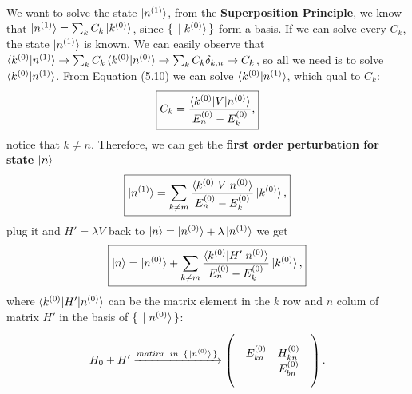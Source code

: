\documentclass[UTF8,12pt]{article} %
\begin{document}
We want to solve the state $\ket{n^{(1)}}$, from the {\bf Superposition Principle}, we know that $\ket{n^{(1)}}=\sum_k{C_k \ket{k^{(0)}}}$, since $\set{\ket{k^{(0)}}}$ form a basis. If we can solve every $C_k$, the state $\ket{n^{(1)}}$ is known. We can easily observe that $\braket{k^{(0)} | n^{(1)}} \to \sum_k{ C_k \braket{ k^{(0)} | n^{(0)} } } \to \sum_k{ C_k \delta_{k,n} } \to C_k$, so all we need is to solve $\braket{ k^{(0)} | n^{(1)} }$. 
\newpage From Equation (5.10) we can solve $\braket{ k^{(0)} | n^{(1)} }$, which qual to $C_k$:
\begin{equation}
    \boxed{ C_k = \frac{\braket{k^{(0)}|V|n^{(0)}}}{E^{(0)}_n-E^{(0)}_k} , }
\end{equation}
notice that $k\neq n$. Therefore, we can get the {\bf first order perturbation for state $\ket{n}$ }
\begin{equation}
    \boxed{ \ket{n^{(1)}} = \sum_{k\neq m} \frac{ \braket{ k^{(0)}|V | n^{(0)} } }{ E^{(0)}_n - E^{(0)}_k } \ket{ k^{(0)}}, }
\end{equation}
plug it and $H'=\lambda V$ back to $ \ket{n} = \ket{n^{(0)}} + \lambda \ket{n^{(1)}} $ we get 
\begin{equation}
    \boxed{ \ket{n} = \ket{n^{(0)}} + \sum_{k\neq m} \frac{ \braket{ k^{(0)}|H'| n^{(0)} } }{ E^{(0)}_n - E^{(0)}_k } \ket{ k^{(0)}} , }
\end{equation}
where $\braket{k^{(0)}|H'|n^{(0)}}$ can be the matrix element in the $k$ row and $n$ colum of matrix $H'$ in the basis of $\set{\ket{n^{(0)}}}$:
\[ H_0+H' \xrightarrow{matirx \hspace{1ex} in \hspace{1ex} \set{\ket{n^{(0)}}}} 
\begin{pmatrix}
    &  &  &  \\
    & E^{(0)}_{ka} & H^{(0)}_{kn} & \\
    &  & E^{(0)}_{bn} & \\
    &  & & \\
\end{pmatrix} . \] 
\end{document}
